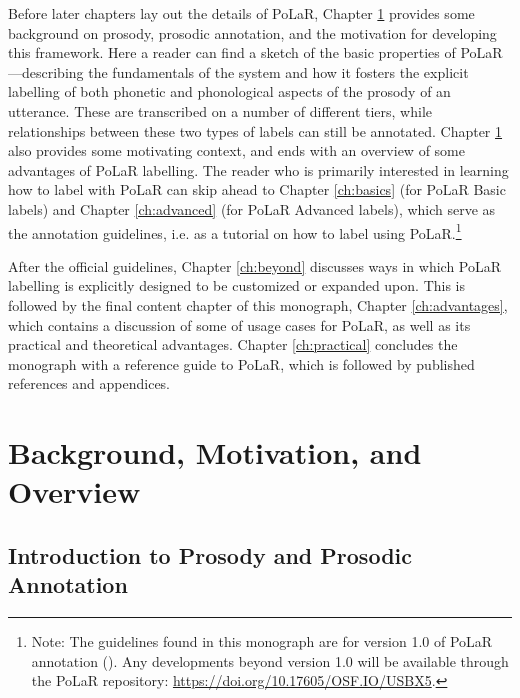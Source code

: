 \documentclass[11pt, twoside]{memoir}
\begin{document}
Before later chapters lay out the details of PoLaR, Chapter \ref{ch:background} provides some background on prosody, prosodic annotation, and the motivation for developing this framework. Here a reader can find a sketch of the basic properties of PoLaR —describing the fundamentals of the system and how it fosters the explicit labelling of both phonetic and phonological aspects of the prosody of an utterance.  These are transcribed on a number of different tiers, while relationships between these two types of labels can still be annotated. Chapter \ref{ch:background} also provides some motivating context, and ends with an overview of some advantages of PoLaR labelling. The reader who is primarily interested in learning how to label with PoLaR can skip ahead to Chapter \ref{ch:basics} (for PoLaR Basic labels) and Chapter \ref{ch:advanced} (for PoLaR Advanced labels), which serve as the annotation guidelines, i.e. as a tutorial on how to label using PoLaR.\footnote{Note: The guidelines found in this monograph are for version 1.0 of PoLaR annotation (\citealt{ahn-21}). Any developments beyond version 1.0 will be available through the PoLaR repository: \href{https://doi.org/10.17605/OSF.IO/USBX5}{https://doi.org/10.17605/OSF.IO/USBX5}.}

After the official guidelines, Chapter \ref{ch:beyond} discusses ways in which PoLaR labelling is explicitly designed to be customized or expanded upon. This is followed by the final content chapter of this monograph, Chapter \ref{ch:advantages}, which contains a discussion of some of usage cases for PoLaR, as well as its practical and theoretical advantages. Chapter \ref{ch:practical} concludes the monograph with a reference guide to PoLaR, which is followed by published references and appendices.

\renewcommand*{\thefootnote}{\arabic{footnote}}



\chapter{Background, Motivation, and Overview}\label{ch:background}

\section{Introduction to Prosody and Prosodic Annotation}\label{sec:introduction-to-prosody-and-prosodic-annotation}
\end{document}
